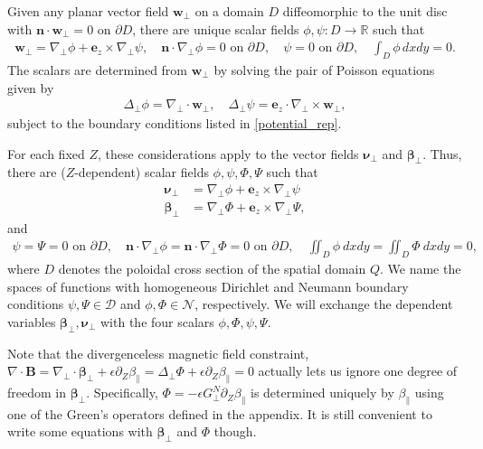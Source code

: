 \documentclass{article}
\newcommand{\para}{\parallel}
\newcommand{\ep}{\epsilon}
\newcommand{\np}{\nabla_\perp}
\newcommand{\lap}{\Delta_\perp}
\newcommand{\p}{\partial}
\newcommand{\GN}{G_\perp^N}
\begin{document}
Given any planar vector field $\bm{w}_\perp$ on a domain $D$ diffeomorphic to the unit disc with $\bm{n}\cdot\bm{w}_\perp = 0$ on $\partial D$, there are unique scalar fields $\phi,\psi:D\rightarrow\mathbb{R}$ such that
\begin{align}
\bm{w}_\perp = \np\phi + \bm{e}_z\times\np\psi,\quad \bm{n}\cdot\np\phi = 0\text{ on }\partial D,\quad \psi = 0\text{ on }\partial D,\quad \int_D\phi \,dxdy = 0.\label{potential_rep}
\end{align}
The scalars are determined from $\bm{w}_\perp$ by solving the pair of Poisson equations given by
\begin{align*}
    \Delta_\perp\phi = \np\cdot\bm{w}_\perp,\quad \Delta_\perp\psi = \bm{e}_z\cdot \np\times\bm{w}_\perp,
\end{align*}
subject to the boundary conditions listed in \eqref{potential_rep}. 

For each fixed $Z$, these considerations apply to the vector fields $\bm{\nu}_\perp$ and $\bm{\beta}_\perp$. Thus, there are ($Z$-dependent) scalar fields $\phi,\psi,\Phi,\Psi$ such that
\begin{align*}
\bm{\nu}_\perp & = \np\phi + \bm{e}_z\times \np\psi\\
\bm{\beta}_\perp & = \np\Phi + \bm{e}_z\times \np\Psi,
\end{align*}
and
\begin{gather*}
\psi = \Psi = 0 \text{ on } \p D,\quad \bm{n}\cdot\np\phi = \bm{n}\cdot\np\Phi = 0 \text{ on } \p D,\quad \iint_D \phi\ dxdy = \iint_D \Phi\ dxdy = 0,
\end{gather*}
where $D$ denotes the poloidal cross section of the spatial domain $Q$. We name the spaces of functions with homogeneous Dirichlet and Neumann boundary conditions $\psi,\Psi\in\mathcal{D}$ and $\phi,\Phi\in\mathcal{N}$, respectively. We will exchange the dependent variables $\bm{\beta}_\perp,\bm{\nu}_\perp$ with the four scalars $\phi,\Phi,\psi,\Psi$.

Note that the divergenceless magnetic field constraint, $\nabla\cdot\bm{B} = \np\cdot\bm{\beta}_\perp + \ep\p_Z\beta_\para = \lap\Phi + \ep\p_Z\beta_\para = 0$ actually lets us ignore one degree of freedom in $\bm{\beta}_\perp$. Specifically, $\Phi = -\ep\GN\p_Z\beta_\para$ is determined uniquely by $\beta_\para$ using one of the Green's operators defined in the appendix. It is still convenient to write some equations with $\bm{\beta}_\perp$ and $\Phi$ though. 
\end{document}
